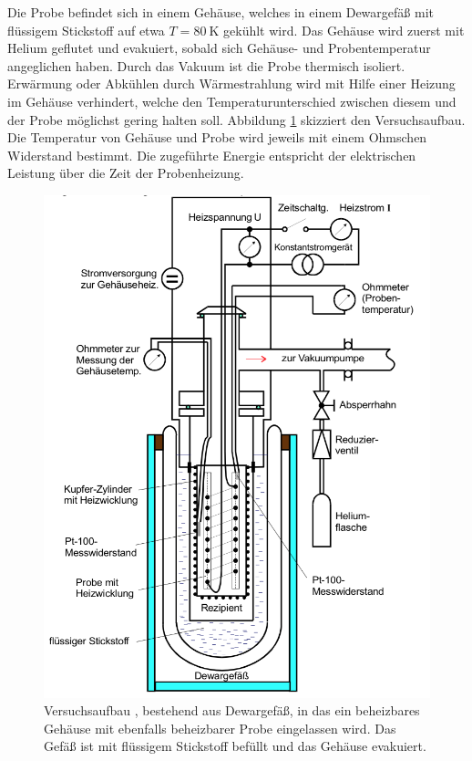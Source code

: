 Die Probe befindet sich in einem Gehäuse, welches in einem Dewargefäß
mit flüssigem Stickstoff auf etwa $T=\SI{80}{\kelvin}$ gekühlt wird.
Das Gehäuse wird zuerst mit Helium geflutet und evakuiert, sobald sich
Gehäuse- und Probentemperatur angeglichen haben.
Durch das Vakuum ist die Probe thermisch isoliert.
Erwärmung oder Abkühlen durch Wärmestrahlung wird mit Hilfe einer Heizung
im Gehäuse verhindert, welche den Temperaturunterschied zwischen diesem und
der Probe möglichst gering halten soll.
Abbildung \ref{fig:aufbau} skizziert den Versuchsaufbau.
Die Temperatur von Gehäuse und Probe wird jeweils mit einem Ohmschen Widerstand
bestimmt.
Die zugeführte Energie entspricht der elektrischen Leistung über die Zeit
der Probenheizung.
\begin{figure}
    \centering
    \includegraphics[width=0.6\linewidth]{img/aufbau.png}
    \caption{
        Versuchsaufbau \cite{V47}, bestehend aus Dewargefäß, in das ein beheizbares
        Gehäuse mit ebenfalls beheizbarer Probe eingelassen wird.
        Das Gefäß ist mit flüssigem Stickstoff befüllt und das Gehäuse
        evakuiert.
    }
    \label{fig:aufbau}
\end{figure}
